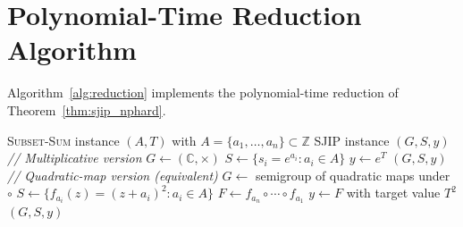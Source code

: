 \documentclass[journal,twocolumn]{IEEEtran}
\theoremstyle{definition}
\theoremstyle{plain}
\newcommand{\C}{\mathbb{C}}
\newcommand{\Z}{\mathbb{Z}}
\begin{document}
\section{Polynomial-Time Reduction Algorithm}
\label{app:reduction}

Algorithm~\ref{alg:reduction} implements the polynomial-time
reduction of Theorem~\ref{thm:sjip_nphard}.

\begin{algorithm}[H]
\caption{Polynomial-Time Reduction: \textsc{Subset-Sum} to SJIP}
\label{alg:reduction}
\begin{algorithmic}[1]
\Require \textsc{Subset-Sum} instance $(A, T)$ with
         $A = \{a_1,\ldots,a_n\} \subset \Z$
\Ensure SJIP instance $(G, S, y)$
\State \textit{// Multiplicative version}
\State $G \leftarrow (\C, \times)$
\State $S \leftarrow \{s_i = e^{a_i} : a_i \in A\}$
\State $y \leftarrow e^T$
\Return $(G, S, y)$
\State \textit{// Quadratic-map version (equivalent)}
\State $G \leftarrow$ semigroup of quadratic maps under $\circ$
\State $S \leftarrow \{f_{a_i}(z) = (z+a_i)^2 : a_i \in A\}$
\State $F \leftarrow f_{a_n} \circ \cdots \circ f_{a_1}$
\State $y \leftarrow F$ with target value $T^2$
\Return $(G, S, y)$
\end{algorithmic}
\end{algorithm}
\end{document}
